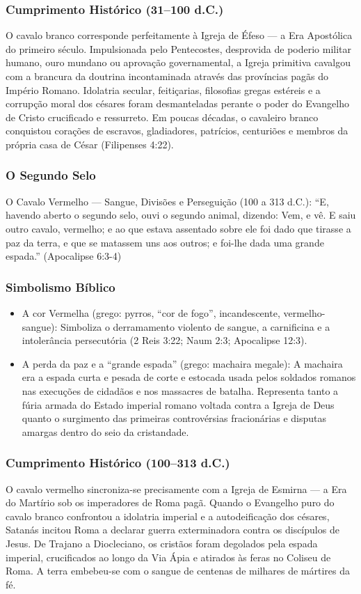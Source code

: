 \subsubsection*{Cumprimento Histórico (31–100 d.C.)}
O cavalo branco corresponde perfeitamente à Igreja de Éfeso — a Era Apostólica do primeiro século. Impulsionada pelo Pentecostes, desprovida de poderio militar humano, ouro mundano ou aprovação governamental, a Igreja primitiva cavalgou com a brancura da doutrina incontaminada através das províncias pagãs do Império Romano. Idolatria secular, feitiçarias, filosofias gregas estéreis e a corrupção moral dos césares foram desmanteladas perante o poder do Evangelho de Cristo crucificado e ressurreto. Em poucas décadas, o cavaleiro branco conquistou corações de escravos, gladiadores, patrícios, centuriões e membros da própria casa de César (Filipenses 4:22).


\subsubsection*{O Segundo Selo}
O Cavalo Vermelho — Sangue, Divisões e Perseguição (100 a 313 d.C.):
``E, havendo aberto o segundo selo, ouvi o segundo animal, dizendo: Vem, e vê. E saiu outro cavalo, vermelho; e ao que estava assentado sobre ele foi dado que tirasse a paz da terra, e que se matassem uns aos outros; e foi-lhe dada uma grande espada.'' (Apocalipse 6:3-4)


\subsubsection*{Simbolismo Bíblico}
\begin{itemize}
  \item A cor Vermelha (grego: pyrros, ``cor de fogo'', incandescente, vermelho-sangue): Simboliza o derramamento violento de sangue, a carnificina e a intolerância persecutória (2 Reis 3:22; Naum 2:3; Apocalipse 12:3).
  \item A perda da paz e a ``grande espada'' (grego: machaira megale): A machaira era a espada curta e pesada de corte e estocada usada pelos soldados romanos nas execuções de cidadãos e nos massacres de batalha. Representa tanto a fúria armada do Estado imperial romano voltada contra a Igreja de Deus quanto o surgimento das primeiras controvérsias fracionárias e disputas amargas dentro do seio da cristandade.
\end{itemize}



\subsubsection*{Cumprimento Histórico (100–313 d.C.)}
O cavalo vermelho sincroniza-se precisamente com a Igreja de Esmirna — a Era do Martírio sob os imperadores de Roma pagã. Quando o Evangelho puro do cavalo branco confrontou a idolatria imperial e a autodeificação dos césares, Satanás incitou Roma a declarar guerra exterminadora contra os discípulos de Jesus. De Trajano a Diocleciano, os cristãos foram degolados pela espada imperial, crucificados ao longo da Via Ápia e atirados às feras no Coliseu de Roma. A terra embebeu-se com o sangue de centenas de milhares de mártires da fé.


